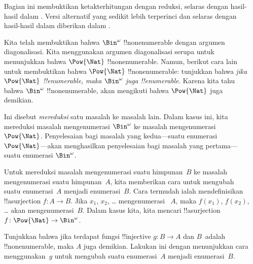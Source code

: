 \documentclass[../../../include/open-logic-section]{subfiles}
\begin{document}


\begin{editorial}
  Bagian ini membuktikan ketakterhitungan dengan reduksi, selaras dengan
  hasil-hasil dalam . Versi alternatif yang sedikit lebih
  terperinci dan selaras dengan hasil-hasil dalam  diberikan
  dalam .
\end{editorial}

Kita telah membuktikan bahwa $\Bin^\omega$ !!{nonenumerable} dengan argumen
diagonalisasi. Kita menggunakan argumen diagonalisasi serupa untuk menunjukkan
bahwa $\Pow{\Nat}$ !!{nonenumerable}. Namun, berikut cara lain untuk
membuktikan bahwa $\Pow{\Nat}$ !!{nonenumerable}: tunjukkan bahwa \emph{jika
$\Pow{\Nat}$ !!{enumerable}, maka $\Bin^\omega$ juga !!{enumerable}}. Karena
kita tahu bahwa $\Bin^\omega$ !!{nonenumerable}, akan mengikuti bahwa
$\Pow{\Nat}$ juga demikian.

Ini disebut \emph{mereduksi} satu masalah ke masalah lain. Dalam kasus ini,
kita mereduksi masalah mengenumerasi $\Bin^\omega$ ke masalah mengenumerasi
$\Pow{\Nat}$. Penyelesaian bagi masalah yang kedua---suatu enumerasi
$\Pow{\Nat}$---akan menghasilkan penyelesaian bagi masalah yang
pertama---suatu enumerasi $\Bin^\omega$.

Untuk mereduksi masalah mengenumerasi suatu himpunan~$B$ ke masalah
mengenumerasi suatu himpunan~$A$, kita memberikan cara untuk mengubah suatu
enumerasi~$A$ menjadi enumerasi~$B$. Cara termudah ialah mendefinisikan
!!a{surjection} $f\colon A \to B$. Jika $x_1$, $x_2$, \dots{} mengenumerasi
~$A$, maka $f(x_1)$, $f(x_2)$, \dots{} akan mengenumerasi~$B$. Dalam kasus
kita, kita mencari !!a{surjection} $f\colon \Pow{\Nat} \to \Bin^\omega$.

\begin{prob}
Tunjukkan bahwa jika terdapat fungsi !!{injective} $g\colon B \to A$ dan
$B$~adalah !!{nonenumerable}, maka $A$ juga demikian. Lakukan ini
dengan menunjukkan cara menggunakan~$g$ untuk mengubah suatu enumerasi~$A$
menjadi enumerasi~$B$.
\end{prob}
\end{document}
